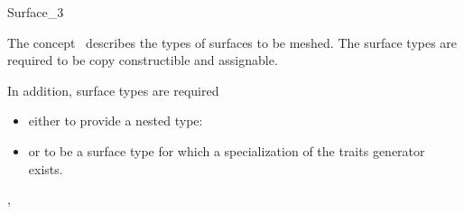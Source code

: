 

\begin{ccRefConcept}{Surface_3}


\ccDefinition
  
The concept \ccRefName\ describes the types of surfaces to be meshed.
The surface types 
are    required to be copy constructible
and assignable.



\ccTypes

In addition, surface types are required
\begin{itemize}
\item 
either to provide a nested type:
\item or to be a surface type for which a specialization
of the traits generator 
exists.
\end{itemize}





\ccHasModels



\ccSeeAlso
{},\\
 \\






\end{ccRefConcept}


